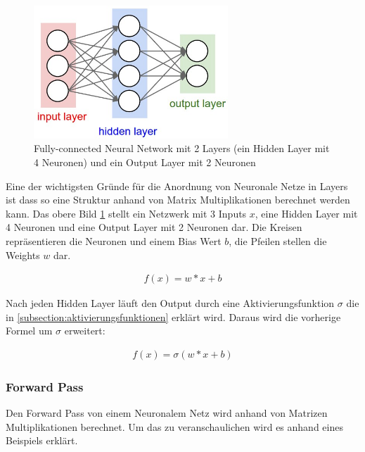 \begin{figure}[H]
  \centering
  \includegraphics[width=0.65\textwidth]{resources/nn/neural_net.jpeg}
  \caption{
    Fully-connected Neural Network mit 2 Layers (ein Hidden Layer mit 4 Neuronen) und ein Output Layer mit 2 Neuronen 
    \cite{fully-connected-neural-network}
  }
  \label{image:neuronal-network}
\end{figure}

Eine der wichtigsten Gründe für die Anordnung von Neuronale Netze in Layers ist dass so eine Struktur anhand von Matrix Multiplikationen
berechnet werden kann. Das obere Bild \ref{image:neuronal-network} stellt ein Netzwerk mit 3 Inputs $ x $, eine Hidden Layer mit 4 Neuronen
und eine Output Layer mit 2
Neuronen dar. Die Kreisen repräsentieren die Neuronen und einem Bias Wert $ b $, die Pfeilen stellen die Weights $ w $ dar.

\begin{align}
  f(x) = w*x + b
\end{align}

Nach jeden Hidden Layer läuft den Output durch eine Aktivierungsfunktion $ \sigma $ die in \ref{subsection:aktivierungsfunktionen} erklärt wird.
Daraus wird die vorherige Formel um $ \sigma $ erweitert:

\begin{align}
  f(x) = \sigma( w*x + b)
\end{align}

\subsubsection{Forward Pass}
Den Forward Pass von einem Neuronalem Netz wird anhand von Matrizen Multiplikationen berechnet. Um das zu veranschaulichen wird
es anhand eines Beispiels erklärt.

